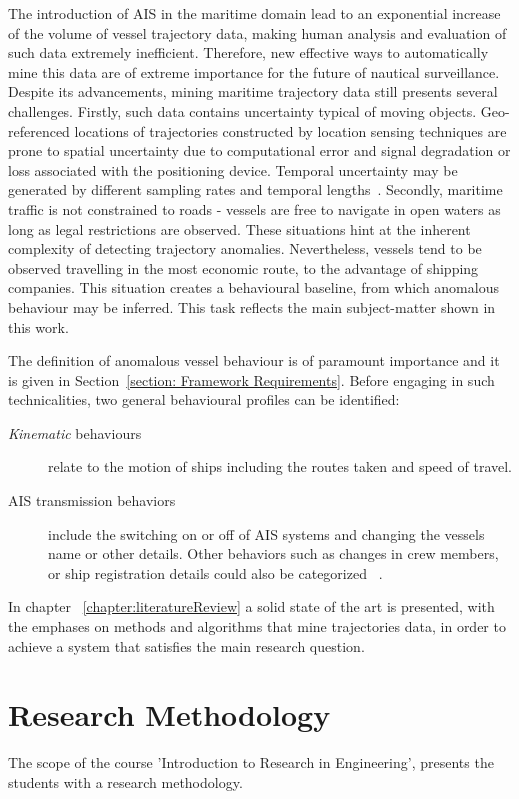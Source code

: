The introduction of AIS in the maritime domain lead to an exponential increase of the volume of vessel trajectory data, making human analysis and evaluation of such data extremely inefficient. Therefore, new effective ways to automatically mine this data are of extreme importance for the future of nautical surveillance. Despite its advancements, mining maritime trajectory data still presents several challenges. Firstly, such data contains uncertainty typical of moving objects. Geo-referenced locations of trajectories constructed by location sensing techniques are prone to spatial uncertainty due to computational error and signal degradation or loss associated with the positioning device. Temporal uncertainty may be generated by different sampling rates and temporal lengths~\cite{Lee}. 
Secondly, maritime traffic is not constrained to roads - vessels are free to navigate in open waters as long as legal restrictions are observed. These situations hint at the inherent complexity of detecting trajectory anomalies.
Nevertheless, vessels tend to be observed travelling in the most economic route, to the advantage of shipping companies. This situation creates a behavioural baseline, from which anomalous behaviour may be inferred. This task reflects the main subject-matter shown in this work.

The definition of anomalous vessel behaviour is of paramount importance and it is given in Section~\ref{section: Framework Requirements}. Before engaging in such technicalities, two general behavioural profiles can be identified:
\begin{description}
\item[\emph{Kinematic} behaviours] relate to the motion of ships including the routes taken and speed of travel.
\item [AIS transmission behaviors] include the switching on or off of AIS systems and changing the vessels name or other details. Other behaviors such as changes in crew members, or ship registration details could also be categorized ~\cite{Lane2010}.
\end{description}

In chapter ~\ref{chapter:literatureReview} a solid state of the art is presented, with the emphases on methods and algorithms that mine trajectories data, in order to achieve a system that satisfies the main research question.


\section{Research Methodology}
The scope of the course 'Introduction to Research in Engineering', presents the students with a research methodology.

